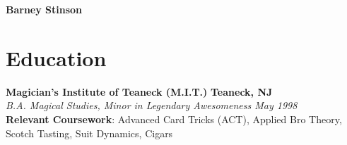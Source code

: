 \documentclass[letterpaper,10.5pt]{article}
\begin{document}
\begin{center}
  {\Huge \textbf{Barney Stinson}} \\
  \vspace{5pt}
\end{center}

\section*{Education}
\textbf{Magician's Institute of Teaneck (M.I.T.)} \hfill \textbf{Teaneck, NJ} \\
\textit{B.A. Magical Studies, Minor in Legendary Awesomeness \hfill May 1998} \\
\textbf{Relevant Coursework}: Advanced Card Tricks (ACT), Applied Bro Theory, Scotch Tasting, Suit Dynamics, Cigars
\end{document}
